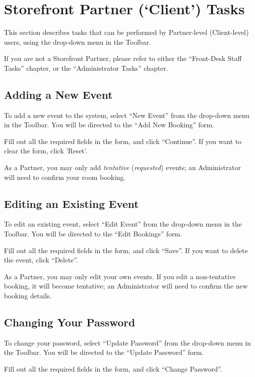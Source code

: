 \section{Storefront Partner (`Client') Tasks}

This section describes tasks that can be performed by Partner-level (Client-level) users, using the drop-down menu in the Toolbar.

If you are not a Storefront Partner, please refer to either the ``Front-Desk Staff Tasks'' chapter, or the ``Administrator Tasks'' chapter.


\subsection{Adding a New Event}

To add a new event to the system, select ``New Event'' from the drop-down menu in the Toolbar. You will be directed to the ``Add New Booking'' form.

Fill out all the required fields in the form, and click ``Continue''. If you want to clear the form, click 'Reset'.

As a Partner, you may only add \textit{tentative} (\textit{requested}) events; an Administrator will need to confirm your room booking.


\subsection{Editing an Existing Event}

To edit an existing event, select ``Edit Event'' from the drop-down menu in the Toolbar. You will be directed to the ``Edit Bookings'' form.

Fill out all the required fields in the form, and click ``Save''. If you want to delete the event, click ``Delete''.

As a Partner, you may only edit your own events. If you edit a non-tentative booking, it will become tentative; an Administrator will need to confirm the new booking details.


\subsection{Changing Your Password}

To change your password, select ``Update Password'' from the drop-down menu in the Toolbar. You will be directed to the ``Update Password'' form.

Fill out all the required fields in the form, and click ``Change Password''.


